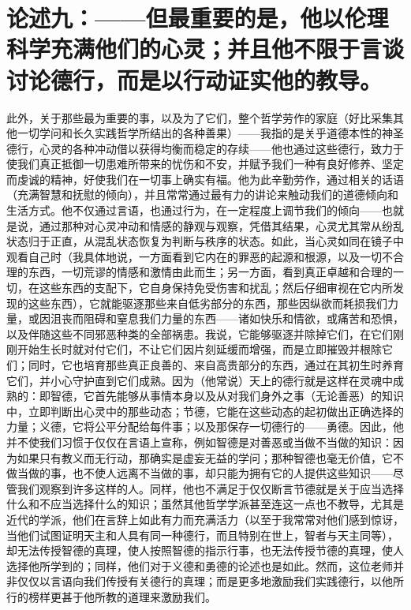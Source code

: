 \section{论述九：——但最重要的是，他以伦理科学充满他们的心灵；并且他不限于言谈讨论德行，而是以行动证实他的教导。}

此外，关于那些最为重要的事，以及为了它们，整个哲学劳作的家庭（好比采集其他一切学问和长久实践哲学所结出的各种善果）——我指的是关乎道德本性的神圣德行，心灵的各种冲动借以获得均衡而稳定的存续——他也通过这些德行，致力于使我们真正抵御一切患难所带来的忧伤和不安，并赋予我们一种有良好修养、坚定而虔诚的精神，好使我们在一切事上确实有福。他为此辛勤劳作，通过相关的话语（充满智慧和抚慰的倾向），并且常常通过最有力的讲论来触动我们的道德倾向和生活方式。他不仅通过言语，也通过行为，在一定程度上调节我们的倾向——也就是说，通过那种对心灵冲动和情感的静观与观察，凭借其结果，心灵尤其常从纷乱状态归于正直，从混乱状态恢复为判断与秩序的状态。如此，当心灵如同在镜子中观看自己时（我具体地说，一方面看到它内在的罪恶的起源和根源，以及一切不合理的东西，一切荒谬的情感和激情由此而生；另一方面，看到真正卓越和合理的一切，在这些东西的支配下，它自身保持免受伤害和扰乱；然后仔细审视在它内所发现的这些东西），它就能驱逐那些来自低劣部分的东西，那些因纵欲而耗损我们力量，或因沮丧而阻碍和窒息我们力量的东西——诸如快乐和情欲，或痛苦和恐惧，以及伴随这些不同邪恶种类的全部祸患。我说，它能够驱逐并除掉它们，在它们刚刚开始生长时就对付它们，不让它们因片刻延缓而增强，而是立即摧毁并根除它们；同时，它也培育那些真正良善的、来自高贵部分的东西，通过在其初生时养育它们，并小心守护直到它们成熟。因为（他常说）天上的德行就是这样在灵魂中成熟的：即智德，它首先能够从事情本身以及从对我们身外之事（无论善恶）的知识中，立即判断出心灵中的那些动态；节德，它能在这些动态的起初做出正确选择的力量；义德，它将公平分配给每件事；以及那保存一切德行的——勇德。因此，他并不使我们习惯于仅仅在言语上宣称，例如智德是对善恶或当做不当做的知识：因为如果只有教义而无行动，那确实是虚妄无益的学问；那种智德也毫无价值，它不做当做的事，也不使人远离不当做的事，却只能为拥有它的人提供这些知识——尽管我们观察到许多这样的人。同样，他也不满足于仅仅断言节德就是关于应当选择什么和不应当选择什么的知识；虽然其他哲学学派甚至连这一点也不教导，尤其是近代的学派，他们在言辞上如此有力而充满活力（以至于我常常对他们感到惊讶，当他们试图证明天主和人具有同一种德行，而且特别在世上，智者与天主同等），却无法传授智德的真理，使人按照智德的指示行事，也无法传授节德的真理，使人选择他所学到的；同样，他们对于义德和勇德的论述也是如此。然而，这位老师并非仅仅以言语向我们传授有关德行的真理；而是更多地激励我们实践德行，以他所行的榜样更甚于他所教的道理来激励我们。\par

